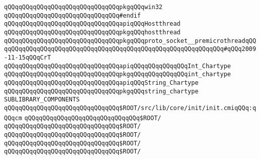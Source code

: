 \newline
\verb|qQQqqQQqqQQqqQQqqQQqqQQqqQQqqQQqpkgqQQqwin32|\newline
\verb|qQQqqQQqqQQqqQQqqQQqqQQqqQQqqQQq#endif|\newline
\newline
\verb|qQQqqQQqqQQqqQQqqQQqqQQqqQQqqQQqapiqQQqHostthread|\newline
\verb|qQQqqQQqqQQqqQQqqQQqqQQqqQQqqQQqpkgqQQqhostthread|\newline
\newline
\verb|qQQqqQQqqQQqqQQqqQQqqQQqqQQqqQQqpkgqQQqproto_socket__premicrothreadqQQqqQQqqQQqqQQqqQQqqQQqqQQqqQQqqQQqqQQqqQQqqQQqqQQqqQQqqQQqqQQq#qQQq2009-11-15qQQqCrT|\newline
\newline
\verb|qQQqqQQqqQQqqQQqqQQqqQQqqQQqqQQqapiqQQqqQQqqQQqqQQqInt_Chartype|\newline
\verb|qQQqqQQqqQQqqQQqqQQqqQQqqQQqqQQqpkgqQQqqQQqqQQqqQQqint_chartype|\newline
\newline
\verb|qQQqqQQqqQQqqQQqqQQqqQQqqQQqqQQqapiqQQqString_Chartype|\newline
\verb|qQQqqQQqqQQqqQQqqQQqqQQqqQQqqQQqpkgqQQqstring_chartype|\newline
\newline
\verb|SUBLIBRARY_COMPONENTS|\newline
\newline
\verb|qQQqqQQqqQQqqQQqqQQqqQQqqQQqqQQq$ROOT/src/lib/core/init/init.cmiqQQq:qQQqcm|\newline
\newline
\verb|qQQqqQQqqQQqqQQqqQQqqQQqqQQqqQQq$ROOT/|\newline
\newline
\verb|qQQqqQQqqQQqqQQqqQQqqQQqqQQqqQQq$ROOT/|\newline
\verb|qQQqqQQqqQQqqQQqqQQqqQQqqQQqqQQq$ROOT/|\newline
\verb|qQQqqQQqqQQqqQQqqQQqqQQqqQQqqQQq$ROOT/|\newline
\verb|qQQqqQQqqQQqqQQqqQQqqQQqqQQqqQQq$ROOT/|\newline
